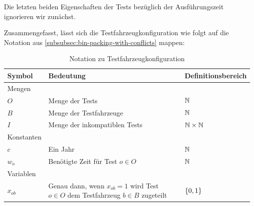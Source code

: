 Die letzten beiden Eigenschaften der Tests bezüglich der Ausführungszeit ignorieren wir zunächst.

Zusammengefasst, lässt sich die Testfahrzeugkonfiguration wie folgt auf die Notation aus
\cref{subsubsec:bin-packing-with-conflicts} mappen:
\begin{table}[H]
    \begin{tabularx}{\textwidth}{  l | X | l }
    Symbol & Bedeutung & Definitionsbereich \\\hline\hline
    Mengen & & \\\hline\hline
    $O$ & Menge der Tests & $\mathbb{N}$\\\hline
    $B$ & Menge der Testfahrzeuge & $\mathbb{N}$\\\hline
    $I$ & Menge der inkompatiblen Tests & $\mathbb{N}\times\mathbb{N}$\\\hline\hline
    Konstanten &  &  \\\hline\hline
    $c$ & Ein Jahr & $\mathbb{N}$\\\hline
    $w_o$ & Benötigte Zeit für Test $o\in O$ & $\mathbb{N}$\\\hline\hline
    Variablen &  &  \\\hline\hline
    $x_{ob}$ & Genau dann, wenn $x_{ob}=1$ wird Test $o\in O$ dem Testfahrzeug $b\in B$ zugeteilt & $\{0,1\}$\\\hline
    \end{tabularx}
    \caption{Notation zu Testfahrzeugkonfiguration}\label{tab:notation_test_vehicle}
\end{table}